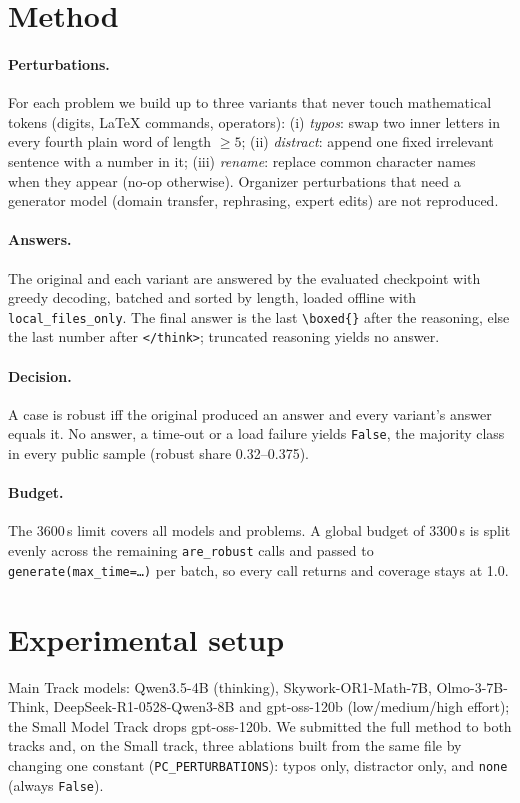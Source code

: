 \documentclass{article}
\begin{document}
\section{Method}
\paragraph{Perturbations.} For each problem we build up to three variants that never touch mathematical tokens (digits, \LaTeX{} commands, operators): (i) \emph{typos}: swap two inner letters in every fourth plain word of length $\geq 5$; (ii) \emph{distract}: append one fixed irrelevant sentence with a number in it; (iii) \emph{rename}: replace common character names when they appear (no-op otherwise). Organizer perturbations that need a generator model (domain transfer, rephrasing, expert edits) are not reproduced.
\paragraph{Answers.} The original and each variant are answered by the evaluated checkpoint with greedy decoding, batched and sorted by length, loaded offline with \texttt{local\_files\_only}. The final answer is the last \texttt{\textbackslash boxed\{\}} after the reasoning, else the last number after \texttt{</think>}; truncated reasoning yields no answer.
\paragraph{Decision.} A case is robust iff the original produced an answer and every variant's answer equals it. No answer, a time-out or a load failure yields \texttt{False}, the majority class in every public sample (robust share 0.32--0.375).
\paragraph{Budget.} The 3600\,s limit covers all models and problems. A global budget of 3300\,s is split evenly across the remaining \texttt{are\_robust} calls and passed to \texttt{generate(max\_time=\dots)} per batch, so every call returns and coverage stays at 1.0.

\section{Experimental setup}
Main Track models: Qwen3.5-4B (thinking), Skywork-OR1-Math-7B, Olmo-3-7B-Think, DeepSeek-R1-0528-Qwen3-8B and gpt-oss-120b (low/medium/high effort); the Small Model Track drops gpt-oss-120b. We submitted the full method to both tracks and, on the Small track, three ablations built from the same file by changing one constant (\texttt{PC\_PERTURBATIONS}): typos only, distractor only, and \texttt{none} (always \texttt{False}).
\end{document}
